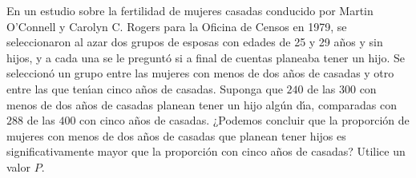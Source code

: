 \begin{enunciado}
 En un estudio sobre la fertilidad de mujeres casadas conducido por Martin O'Connell
 y Carolyn C. Rogers para la Oficina de Censos en 1979,
 se seleccionaron al azar dos grupos de esposas con edades de 25 y 29 a\~nos
 y sin hijos, y a cada una se le pregunt\'o si a final de cuentas planeaba tener
 un hijo.
 Se seleccion\'o un grupo entre las mujeres con menos de dos a\~nos de casadas
 y otro entre las que ten\'{\i}an cinco a\~nos de casadas.
 Suponga que $240$ de las $300$ con menos de dos a\~nos de casadas planean
 tener un hijo alg\'un d\'{\i}a,
 comparadas con $288$ de las $400$ con cinco a\~nos de casadas.
 ¿Podemos concluir que la proporci\'on de mujeres con menos de dos a\~nos de casadas
 que planean tener hijos es significativamente mayor que la proporci\'on
 con cinco a\~nos de casadas? Utilice un valor $P$.
\end{enunciado}

